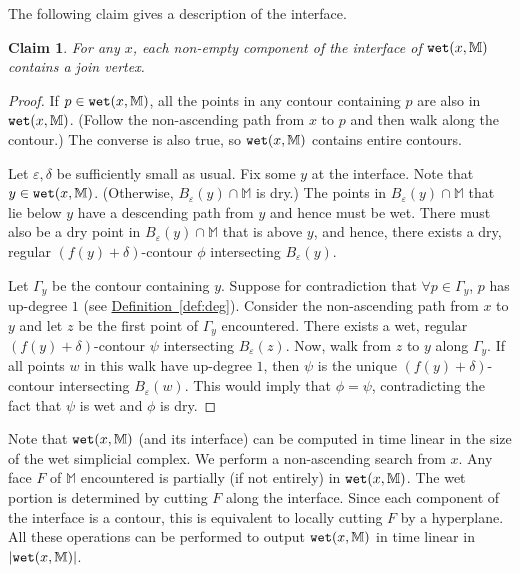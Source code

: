 \documentclass[11pt]{article}
\newtheorem{claim}[theorem]{Claim}
\theoremstyle{definition}
\newcommand{\MM}{\mathbb{M}}
\newcommand{\eps}{\varepsilon}
\newcommand{\Def}[1]{\hyperref[def:#1]{Definition~\ref*{def:#1}}} %
\newcommand{\wet}{{\tt wet}}
\begin{document}
The following claim gives a description of the interface. 

\begin{claim} \label{clm:inter} For any $x$, each non-empty component of the interface of $\wet(x,\MM)$ contains a join vertex.
\end{claim}

\begin{proof} If $p \in \wet(x,\MM)$, all the points in any contour containing $p$ are also in $\wet(x,\MM)$.
 (Follow the non-ascending path from $x$ to $p$ and then walk along the contour.) The converse is also true,
 so $\wet(x,\MM)$ contains entire contours.

Let $\eps, \delta$ be sufficiently small as usual. Fix some $y$ at the interface.
Note that $y \in \wet(x,\MM)$. (Otherwise, $B_\eps(y)\cap \MM$ is dry.)
The points in $B_\eps(y)\cap \MM$ that lie below $y$ have a descending path from $y$ and hence must be wet.
There must also be a dry point in $B_\eps(y)\cap \MM$ that is above $y$, and hence,
there exists a dry, regular $(f(y)+\delta)$-contour $\phi$ intersecting $B_\eps(y)$.

Let $\Gamma_y$ be the contour containing $y$.  Suppose for contradiction
that $\forall p \in \Gamma_y$, $p$ has up-degree $1$ (see \Def{deg}). Consider the non-ascending path from $x$ to $y$ and let $z$
be the first point of $\Gamma_y$ encountered. There exists a wet, regular $(f(y) + \delta)$-contour $\psi$ 
intersecting $B_\eps(z)$. Now, walk from $z$ to $y$ along $\Gamma_y$. If all points $w$ in this walk
have up-degree $1$, then $\psi$ is the unique $(f(y)+\delta)$-contour
intersecting $B_\eps(w)$. This would imply that $\phi = \psi$, contradicting the fact that $\psi$ is wet
and $\phi$ is dry.
%
\end{proof}

Note that $\wet(x,\MM)$ (and its interface) can be computed in time linear in the size of the wet simplicial complex.
We perform a non-ascending search from $x$. Any face $F$ of $\MM$ encountered is partially (if not entirely) in $\wet(x,\MM)$.
The wet portion is determined by cutting $F$ along the interface. Since each component of the interface is a contour, this is equivalent
to locally cutting $F$ by a hyperplane. All these operations can be performed to output $\wet(x,\MM)$ in time linear in $|\wet(x,\MM)|$.
\end{document}
